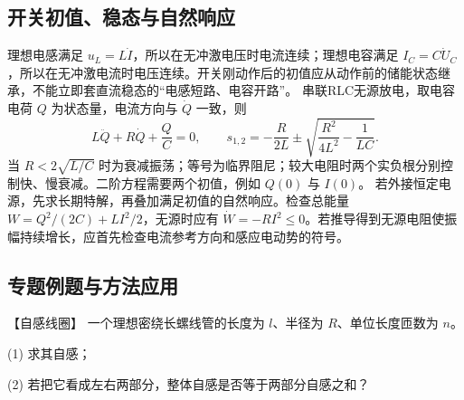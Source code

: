 {\subsection{开关初值、稳态与自然响应}
理想电感满足 $u_L=L\dot I$，所以在无冲激电压时电流连续；理想电容满足 $I_C=C\dot U_C$，所以在无冲激电流时电压连续。开关刚动作后的初值应从动作前的储能状态继承，不能立即套直流稳态的“电感短路、电容开路”。
串联RLC无源放电，取电容电荷 $Q$ 为状态量，电流方向与 $\dot Q$ 一致，则
\[
 L\ddot Q+R\dot Q+\frac QC=0,
 \qquad s_{1,2}=-\frac R{2L}\pm\sqrt{\frac{R^2}{4L^2}-\frac1{LC}}.
\]
当 $R<2\sqrt{L/C}$ 时为衰减振荡；等号为临界阻尼；较大电阻时两个实负根分别控制快、慢衰减。二阶方程需要两个初值，例如 $Q(0)$ 与 $I(0)$。
若外接恒定电源，先求长期特解，再叠加满足初值的自然响应。检查总能量
$W=Q^2/(2C)+LI^2/2$，无源时应有 $\dot W=-RI^2\le0$。若推导得到无源电阻使振幅持续增长，应首先检查电流参考方向和感应电动势的符号。


\subsection{专题例题与方法应用}

\begin{origexamplebox}{【自感线圈】}\label{ch24:ex:s40-9-17}
一个理想密绕长螺线管的长度为 $l$、半径为 $R$、单位长度匝数为 $n$。

(1) 求其自感；

(2) 若把它看成左右两部分，整体自感是否等于两部分自感之和？

%
\begin{center}\end{center}
\end{origexamplebox}

}
